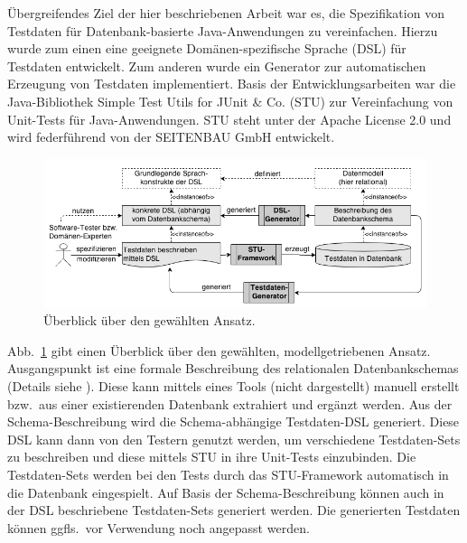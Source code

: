 Übergreifendes Ziel der hier beschriebenen Arbeit \cite{MT:Moll:2013} war es, die Spezifikation von Testdaten für Datenbank-basierte Java-Anwendungen zu vereinfachen.
%
Hierzu wurde zum einen  eine geeignete Domänen-spezifische Sprache (DSL) für Testdaten entwickelt.
%
%
Zum anderen wurde ein Generator zur automatischen Erzeugung von Testdaten implementiert. 
%
%
%
Basis der Entwicklungsarbeiten war die Java-Bibliothek Simple Test Utils for JUnit \& Co. (STU) zur Vereinfachung von Unit-Tests für Java-Anwendungen.
%
STU steht unter der Apache License 2.0 und wird federführend von der  SEITENBAU GmbH entwickelt. 
%


\begin{figure}[tb]
	\begin{center}
		\includegraphics[width=12.75cm]{images/ansatz.png}
		\caption{\label{ansatz}Überblick über den gewählten Ansatz.}
	\end{center}
\end{figure}

Abb.~\ref{ansatz} gibt einen Überblick über den gewählten, modellgetriebenen Ansatz.
%
Ausgangspunkt ist eine formale Beschreibung des relationalen Datenbankschemas (Details siehe \cite{MT:Moll:2013}).
%
Diese kann mittels eines Tools (nicht dargestellt) manuell erstellt bzw.~aus einer existierenden Datenbank extrahiert und ergänzt werden.
%
Aus der Schema-Beschreib\-ung wird die Schema-abhängige Testdaten-DSL generiert. 
%
Diese DSL kann dann von den Testern genutzt werden, um verschiedene Testdaten-Sets zu beschreiben und diese mittels STU in ihre Unit-Tests einzubinden.
%
Die Testdaten-Sets werden bei den Tests durch das STU-Framework automatisch in die Datenbank eingespielt.
%
%
Auf Basis der Schema-Be\-schrei\-bung können auch in der DSL beschriebene Test\-da\-ten-Sets  generiert werden. Die generierten Testdaten können ggfls.~vor Verwendung noch angepasst werden.
%
%
%





	




